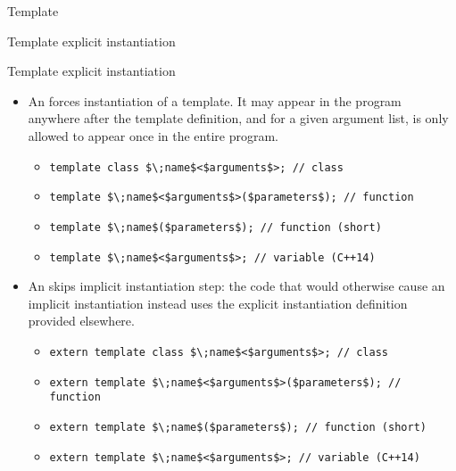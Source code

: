 \begin{frame}{Template}{}
  \begin{example}[Template]
  \end{example}
\end{frame}

\begin{frame}{Template explicit instantiation}{}
  \begin{block}{Template explicit instantiation}
    \begin{itemize}
    \item
      An  forces instantiation of a template. It may appear in the program anywhere after the template definition, and for a given argument list, is only allowed to appear once in the entire program.
      \begin{itemize}
        \item
          \lstinline[mathescape]!template class $\;name$<$arguments$>; // class!
        \item
          \lstinline[mathescape]!template $\;name$<$arguments$>($parameters$); // function!
        \item
          \lstinline[mathescape]!template $\;name$($parameters$); // function (short)!
        \item
          \lstinline[mathescape]!template $\;name$<$arguments$>; // variable (C++14)!
      \end{itemize}
    \item
      An  skips implicit instantiation step: the code that would otherwise cause an implicit instantiation instead uses the explicit instantiation definition provided elsewhere.
      \begin{itemize}
        \item
          \lstinline[mathescape]!extern template class $\;name$<$arguments$>; // class!
        \item
          \lstinline[mathescape]!extern template $\;name$<$arguments$>($parameters$); // function!
        \item
          \lstinline[mathescape]!extern template $\;name$($parameters$); // function (short)!
        \item
          \lstinline[mathescape]!extern template $\;name$<$arguments$>; // variable (C++14)!
      \end{itemize}
    \end{itemize}
  \end{block}
\end{frame}

